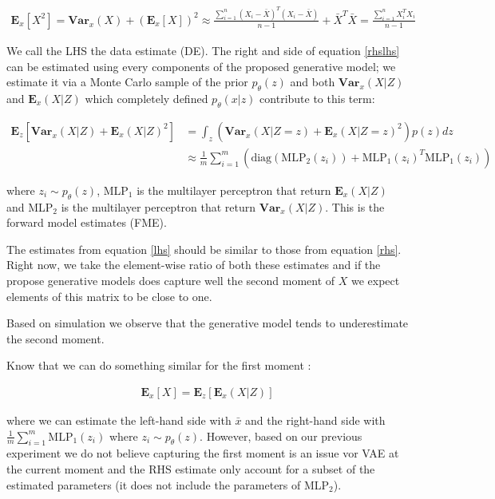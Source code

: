 \documentclass{article}
\newcommand{\Vx}{\textbf{Var}_x}
\newcommand{\Ex}{\textbf{E}_x}
\newcommand{\Ez}{\textbf{E}_z}
\begin{document}
\begin{align}
\Ex[X^2] = \Vx(X)+ (\Ex[X])^2 \approx \frac{\sum_{i=1}^n(X_i-\bar{X})^T(X_i-\bar{X})}{n-1} + \bar{X}^T\bar{X} = \frac{\sum_{i=1}^n X_i^TX_i}{n-1}
\label{lhs}
\end{align}

We call the LHS the data estimate (DE). The right and side of equation \ref{rhslhs} can be estimated using every components of the proposed generative model; we estimate it via a Monte Carlo sample of the prior $p_\theta(z)$ and both $\Vx(X|Z)$ and $\Ex(X|Z)$ which completely defined $p_\theta(x|z)$ contribute to this term:

\begin{align}
\Ez[\Vx(X|Z) + \Ex(X|Z)^2] &= \int_z (\Vx(X|Z=z)+\Ex(X|Z=z)^2)p(z) dz \\ 
&\approx \frac{1}{m} \sum_{i=1}^m ( \text{diag}(\text{MLP}_2(z_i)) + \text{MLP}_1(z_i)^T\text{MLP}_1(z_i))
\label{rhs}
\end{align}

where $z_i \sim p_\theta(z)$, MLP$_1$ is the multilayer perceptron that return $\Ex(X|Z)$ and MLP$_2$ is the multilayer perceptron that return $\Vx(X|Z)$. This is the forward model estimates (FME). 

\bigskip

The estimates from equation \ref{lhs} should be similar to those from equation \ref{rhs}. Right now, we take the element-wise ratio of both these estimates and if the propose generative models does capture well the second moment of $X$ we expect elements of this matrix to be close to one.

\bigskip

Based on simulation we observe that the generative model tends to underestimate the second moment.

\bigskip

Know that we can do something similar for the first moment :

\begin{align}
\Ex[X] = \Ez[\Ex(X|Z)] 
\label{rhs}
\end{align}

where we can estimate the left-hand side with $\bar{x}$ and the right-hand side with $\frac{1}{m} \sum_{i=1}^m \text{MLP}_1(z_i)$ where $z_i \sim p_\theta(z)$. However, based on our previous experiment we do not believe capturing the first moment is an issue vor VAE at the current moment and the RHS estimate only account for a subset of the estimated parameters (it does not include the parameters of MLP$_2$). 
\end{document}
